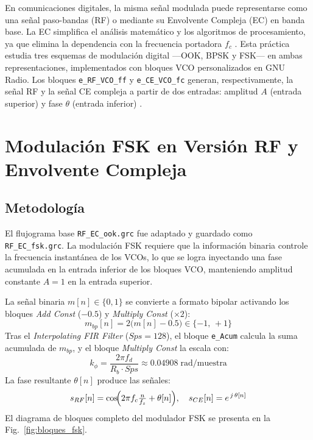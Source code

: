 \documentclass[conference]{IEEEtran}
\begin{document}
En comunicaciones digitales, la misma señal modulada puede representarse como una 
señal paso-bandas (RF) o mediante su Envolvente Compleja (EC) en banda base. La EC 
simplifica el análisis matemático y los algoritmos de procesamiento, ya que elimina 
la dependencia con la frecuencia portadora $f_c$ \cite{proakis2008}. Esta práctica 
estudia tres esquemas de modulación digital —OOK, BPSK y FSK— en ambas 
representaciones, implementados con bloques VCO personalizados en GNU Radio. 
Los bloques \texttt{e\_RF\_VCO\_ff} y \texttt{e\_CE\_VCO\_fc} generan, 
respectivamente, la señal RF y la señal CE compleja a partir de dos entradas: 
amplitud $A$ (entrada superior) y fase $\theta$ (entrada inferior) \cite{gnuradio}.


\section{Modulación FSK en Versión RF y Envolvente Compleja}
\label{sec:fsk}

\subsection{Metodología}

El flujograma base \texttt{RF\_EC\_ook.grc} fue adaptado y guardado como 
\texttt{RF\_EC\_fsk.grc}. La modulación FSK requiere que la información binaria 
controle la frecuencia instantánea de los VCOs, lo que se logra inyectando una 
fase acumulada en la entrada inferior de los bloques VCO, manteniendo amplitud 
constante $A = 1$ en la entrada superior.

La señal binaria $m[n] \in \{0,1\}$ se convierte a formato bipolar activando los 
bloques \textit{Add Const} ($-0.5$) y \textit{Multiply Const} ($\times 2$):
\begin{equation}
    m_{bp}[n] = 2\bigl(m[n] - 0.5\bigr) \in \{-1,\,+1\}
    \label{eq:bipolar}
\end{equation}
Tras el \textit{Interpolating FIR Filter} ($Sps = 128$), el bloque 
\texttt{e\_Acum} calcula la suma acumulada de $m_{bp}$, y el bloque 
\textit{Multiply Const} la escala con:
\begin{equation}
    k_\phi = \frac{2\pi f_d}{R_b \cdot Sps} \approx 0.04908\;\text{rad/muestra}
    \label{eq:kphi}
\end{equation}
La fase resultante $\theta[n]$ produce las señales:
\begin{equation}
    s_{RF}[n] = \cos\!\Bigl(2\pi f_c \tfrac{n}{f_s} + \theta[n]\Bigr), \quad
    s_{CE}[n] = e^{\,j\,\theta[n]}
    \label{eq:fsk}
\end{equation}
El diagrama de bloques completo del modulador FSK se presenta en la 
Fig.~\ref{fig:bloques_fsk}.
\end{document}
